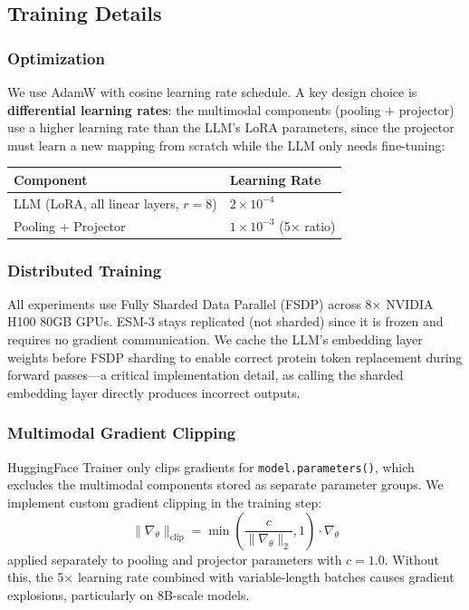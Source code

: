 \documentclass[11pt]{article}
\begin{document}
\subsection{Training Details}

\subsubsection{Optimization}

We use AdamW with cosine learning rate schedule. A key design choice is \textbf{differential learning rates}: the multimodal components (pooling + projector) use a higher learning rate than the LLM's LoRA parameters, since the projector must learn a new mapping from scratch while the LLM only needs fine-tuning:

\begin{table}[h]
    \centering
    \begin{tabular}{@{}ll@{}}
        \toprule
        Component & Learning Rate \\
        \midrule
        LLM (LoRA, all linear layers, $r=8$) & $2 \times 10^{-4}$ \\
        Pooling + Projector & $1 \times 10^{-3}$ (5$\times$ ratio) \\
        \bottomrule
    \end{tabular}
\end{table}

\subsubsection{Distributed Training}

All experiments use Fully Sharded Data Parallel (FSDP) across 8$\times$ NVIDIA H100 80GB GPUs. ESM-3 stays replicated (not sharded) since it is frozen and requires no gradient communication. We cache the LLM's embedding layer weights before FSDP sharding to enable correct protein token replacement during forward passes---a critical implementation detail, as calling the sharded embedding layer directly produces incorrect outputs.

\subsubsection{Multimodal Gradient Clipping}

HuggingFace Trainer only clips gradients for \texttt{model.parameters()}, which excludes the multimodal components stored as separate parameter groups. We implement custom gradient clipping in the training step:
\begin{equation}
    \|\nabla_\theta\|_\text{clip} = \min\left(\frac{c}{\|\nabla_\theta\|_2}, 1\right) \cdot \nabla_\theta
\end{equation}
applied separately to pooling and projector parameters with $c = 1.0$. Without this, the 5$\times$ learning rate combined with variable-length batches causes gradient explosions, particularly on 8B-scale models.
\end{document}
